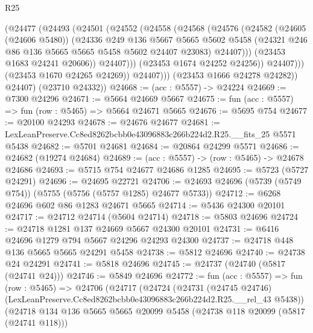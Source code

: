 \begin{lexlean}{R25}
\begin{coremodule}
                      (@24477
                        (@24493
                          (@24501
                            (@24552
                              (@24558
                                (@24568
                                  (@24576
                                    (@24582
                                      (@24605 (@24606 @5480))
                                      (@24336
                                        @249
                                        @136
                                        @5667
                                        @5665
                                        @5602
                                        @5458
                                        (@24321 @246 @86 @136 @5665 @5665 @5458 @5602 @24407 @23083)
                                        @24407)))
                                  (@23453 @1683 @24241 @20606))
                                @24407)))
                          (@23453 @1674 @24252 @24256))
                        @24407)))
                  (@23453 @1670 @24265 @24269))
                @24407)))
          (@23453 @1666 @24278 @24282))
        @24407)
      (@23710 @24332))
@24668 := (acc : @5557) -> @24224
@24669 := @7300 @24296
@24671 := @5664 @24669 @5667
@24675 := fun (acc : @5557) => fun (row : @5465) => @5664 @24671 @5665
@24676 := @5695 @754
@24677 := @20100 @24293
@24678 := @24676 @24677
@24681 := LexLeanPreserve.Cc8ed8262bcbb0e43096883c266b224d2.R25.__fits_25 @5571 @5438
@24682 := @5701 @24681
@24684 := @20864 @24299 @5571
@24686 := @24682 (@19274 @24684)
@24689 := (acc : @5557) -> (row : @5465) -> @24678 @24686
@24693 := @5715 @754 @24677 @24686 @1285
@24695 := @5723 (@5727 @24291)
@24696 := @24695 @22721
@24706 := @24693 @24696 (@5739 (@5749 @754)) (@5755 (@5756 (@5757 @1285) @24677 @5733))
@24712 := @6268 @24696 @602 @86 @1283 @24671 @5665
@24714 := @5436 @24300 @20101
@24717 := @24712 @24714 (@5604 @24714)
@24718 := @5803 @24696
@24724 := @24718 @1281 @137 @24669 @5667 @24300 @20101
@24731 := @6416 @24696 @1279 @794 @5667 @24296 @24293 @24300
@24737 := @24718 @448 @136 @5665 @5665 @24291 @5458
@24738 := @5812 @24696
@24740 := @24738 @24 @24291
@24741 := @5818 @24696
@24745 := @24737 (@24740 (@5817 (@24741 @24)))
@24746 := @5849 @24696
@24772 := fun (acc : @5557) =>
  fun (row : @5465) =>
  @24706
    (@24717
      (@24724
        (@24731
          (@24745 @24746)
          (LexLeanPreserve.Cc8ed8262bcbb0e43096883c266b224d2.R25.__rel_43 @5438))
        (@24718
          @134
          @136
          @5665
          @5665
          @20099
          @5458
          (@24738 @118 @20099 (@5817 (@24741 @118)))

\end{coremodule}
\end{lexlean}
